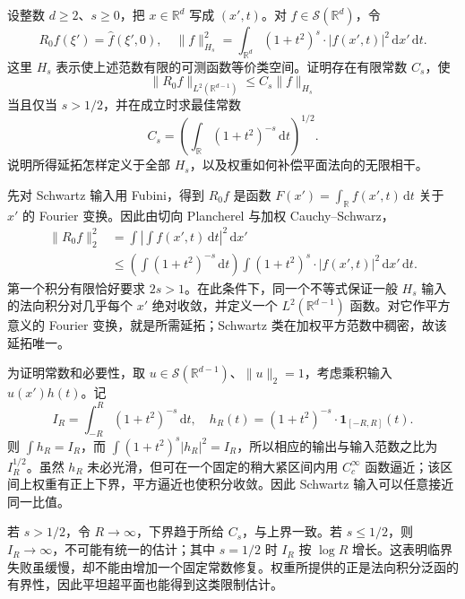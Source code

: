 \begin{exercise}\label{b2:ex:23-new-1}
设整数 \(d\geq2\)、\(s\geq0\)，把 \(x\in\mathbb R^d\) 写成 \((x',t)\)。对 \(f\in\mathcal S(\mathbb R^d)\)，令
\[
 R_0f(\xi')=\widehat f(\xi',0),
 \quad
 \|f\|_{H_s}^2=\int_{\mathbb R^d}(1+t^2)^s\cdot|f(x',t)|^2\,\mathrm dx'\,\mathrm dt.
\]
这里 \(H_s\) 表示使上述范数有限的可测函数等价类空间。证明存在有限常数 \(C_s\)，使
\[
 \|R_0f\|_{L^2(\mathbb R^{d-1})}\leq C_s\|f\|_{H_s}
\]
当且仅当 \(s>1/2\)，并在成立时求最佳常数
\[
 C_s=\left(\int_{\mathbb R}(1+t^2)^{-s}\,\mathrm dt\right)^{1/2}.
\]
说明所得延拓怎样定义于全部 \(H_s\)，以及权重如何补偿平面法向的无限相干。
\end{exercise}
\begin{solution}
先对 Schwartz 输入用 Fubini，得到 \(R_0f\) 是函数
\(F(x')=\int_{\mathbb R}f(x',t)\,\mathrm dt\) 关于 \(x'\) 的 Fourier 变换。因此由切向 Plancherel 与加权 Cauchy--Schwarz，
\[
 \begin{aligned}
 \|R_0f\|_2^2
 &=\int\left|\int f(x',t)\,\mathrm dt\right|^2\,\mathrm dx'\\
 &\leq\left(\int(1+t^2)^{-s}\,\mathrm dt\right)
       \int(1+t^2)^s\cdot|f(x',t)|^2\,\mathrm dx'\,\mathrm dt.
 \end{aligned}
\]
第一个积分有限恰好要求 \(2s>1\)。在此条件下，同一个不等式保证一般 \(H_s\) 输入的法向积分对几乎每个 \(x'\) 绝对收敛，并定义一个 \(L^2(\mathbb R^{d-1})\) 函数。对它作平方意义的 Fourier 变换，就是所需延拓；Schwartz 类在加权平方范数中稠密，故该延拓唯一。

为证明常数和必要性，取 \(u\in\mathcal S(\mathbb R^{d-1})\)、\(\|u\|_2=1\)，考虑乘积输入 \(u(x')h(t)\)。记
\[
 I_R=\int_{-R}^R(1+t^2)^{-s}\,\mathrm dt,
 \quad h_R(t)=(1+t^2)^{-s}\cdot\mathbf1_{[-R,R]}(t).
\]
则 \(\int h_R=I_R\)，而 \(\int(1+t^2)^s|h_R|^2=I_R\)，所以相应的输出与输入范数之比为 \(I_R^{1/2}\)。虽然 \(h_R\) 未必光滑，但可在一个固定的稍大紧区间内用 \(C_c^\infty\) 函数逼近；该区间上权重有正上下界，平方逼近也使积分收敛。因此 Schwartz 输入可以任意接近同一比值。

若 \(s>1/2\)，令 \(R\to\infty\)，下界趋于所给 \(C_s\)，与上界一致。若 \(s\leq1/2\)，则 \(I_R\to\infty\)，不可能有统一的估计；其中 \(s=1/2\) 时 \(I_R\) 按 \(\log R\) 增长。这表明临界失败虽缓慢，却不能由增加一个固定常数修复。权重所提供的正是法向积分泛函的有界性，因此平坦超平面也能得到这类限制估计。
\end{solution}

